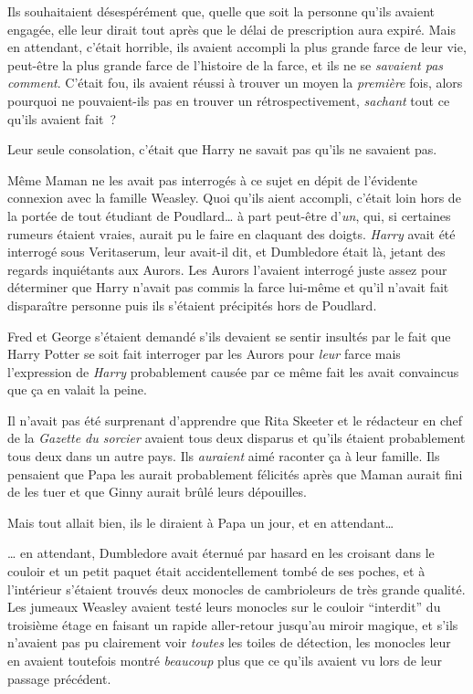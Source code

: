 Ils souhaitaient désespérément que, quelle que soit la personne qu'ils avaient engagée, elle leur dirait tout après que le délai de prescription aura expiré. Mais en attendant, c'était horrible, ils avaient accompli la plus grande farce de leur vie, peut-être la plus grande farce de l'histoire de la farce, et ils ne se \emph{savaient pas comment}. C'était fou, ils avaient réussi à trouver un moyen la \emph{première} fois, alors pourquoi ne pouvaient-ils pas en trouver un rétrospectivement, \emph{sachant} tout ce qu'ils avaient fait~?

Leur seule consolation, c'était que Harry ne savait pas qu'ils ne savaient pas.

Même Maman ne les avait pas interrogés à ce sujet en dépit de l'évidente connexion avec la famille Weasley. Quoi qu'ils aient accompli, c'était loin hors de la portée de tout étudiant de Poudlard… à part peut-être d'\emph{un}, qui, si certaines rumeurs étaient vraies, aurait pu le faire en claquant des doigts. \emph{Harry} avait été interrogé sous Veritaserum, leur avait-il dit, et Dumbledore était là, jetant des regards inquiétants aux Aurors. Les Aurors l'avaient interrogé juste assez pour déterminer que Harry n'avait pas commis la farce lui-même et qu'il n'avait fait disparaître personne puis ils s'étaient précipités hors de Poudlard.

Fred et George s'étaient demandé s'ils devaient se sentir insultés par le fait que Harry Potter se soit fait interroger par les Aurors pour \emph{leur} farce mais l'expression de \emph{Harry} probablement causée par ce même fait les avait convaincus que ça en valait la peine.

Il n'avait pas été surprenant d'apprendre que Rita Skeeter et le rédacteur en chef de la \emph{Gazette du sorcier} avaient tous deux disparus et qu'ils étaient probablement tous deux dans un autre pays. Ils \emph{auraient} aimé raconter ça à leur famille. Ils pensaient que Papa les aurait probablement félicités après que Maman aurait fini de les tuer et que Ginny aurait brûlé leurs dépouilles.

Mais tout allait bien, ils le diraient à Papa un jour, et en attendant…

… en attendant, Dumbledore avait éternué par hasard en les croisant dans le couloir et un petit paquet était accidentellement tombé de ses poches, et à l'intérieur s'étaient trouvés deux monocles de cambrioleurs de très grande qualité. Les jumeaux Weasley avaient testé leurs monocles sur le couloir “interdit” du troisième étage en faisant un rapide aller-retour jusqu'au miroir magique, et s'ils n'avaient pas pu clairement voir \emph{toutes} les toiles de détection, les monocles leur en avaient toutefois montré \emph{beaucoup} plus que ce qu'ils avaient vu lors de leur passage précédent.


